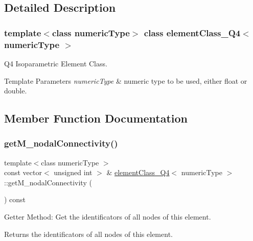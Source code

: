 \subsection{Detailed Description}
\subsubsection*{template$<$class numeric\+Type$>$\newline
class element\+Class\+\_\+\+Q4$<$ numeric\+Type $>$}

Q4 Isoparametric Element Class. 
\begin{DoxyTemplParams}{Template Parameters}
{\em numeric\+Type} & numeric type to be used, either float or double. \\
\hline
\end{DoxyTemplParams}


\subsection{Member Function Documentation}
\mbox{\label{classelement_class___q4_aa6a26e36d49ce1008285cf9eb6ef4748}} 
\subsubsection{\texorpdfstring{get\+M\+\_\+nodal\+Connectivity()}{getM\_nodalConnectivity()}}
{\footnotesize\ttfamily template$<$class numeric\+Type $>$ \\
const vector$<$ unsigned int $>$ \& \mbox{\hyperlink{classelement_class___q4}{element\+Class\+\_\+\+Q4}}$<$ numeric\+Type $>$\+::get\+M\+\_\+nodal\+Connectivity (\begin{DoxyParamCaption}{ }\end{DoxyParamCaption}) const}

Getter Method\+: Get the identificators of all nodes of this element. \begin{DoxyReturn}{Returns}
the identificators of all nodes of this element. 
\end{DoxyReturn}
\mbox{\label{classelement_class___q4_a7503f92c139700e19433c2843496b670}} 

